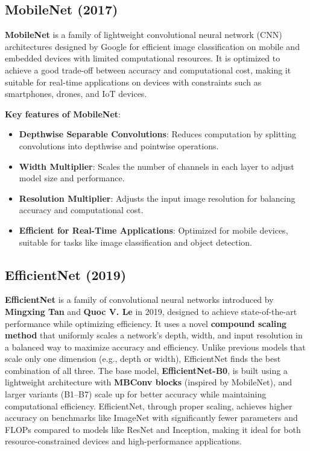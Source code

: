 \subsection{MobileNet (2017)}
\textbf{MobileNet} is a family of lightweight convolutional neural network (CNN) architectures designed by Google for efficient image classification on mobile and embedded devices with limited computational resources. It is optimized to achieve a good trade-off between accuracy and computational cost, making it suitable for real-time applications on devices with constraints such as smartphones, drones, and IoT devices.\cite{howard2017mobilenets}

\textbf{Key features of MobileNet}:
\begin{itemize}
    \item \textbf{Depthwise Separable Convolutions}: Reduces computation by splitting convolutions into depthwise and pointwise operations.
    \item \textbf{Width Multiplier}: Scales the number of channels in each layer to adjust model size and performance.
    \item \textbf{Resolution Multiplier}: Adjusts the input image resolution for balancing accuracy and computational cost.
    \item \textbf{Efficient for Real-Time Applications}: Optimized for mobile devices, suitable for tasks like image classification and object detection.
\end{itemize}

\subsection{EfficientNet (2019)}
\textbf{EfficientNet} is a family of convolutional neural networks introduced by \textbf{Mingxing Tan} and \textbf{Quoc V. Le} in 2019, designed to achieve state-of-the-art performance while optimizing efficiency. It uses a novel \textbf{compound scaling method} that uniformly scales a network's depth, width, and input resolution in a balanced way to maximize accuracy and efficiency. Unlike previous models that scale only one dimension (e.g., depth or width), EfficientNet finds the best combination of all three. The base model, \textbf{EfficientNet-B0}, is built using a lightweight architecture with \textbf{MBConv blocks} (inspired by MobileNet), and larger variants (B1–B7) scale up for better accuracy while maintaining computational efficiency. EfficientNet, through proper scaling, achieves higher accuracy on benchmarks like ImageNet with significantly fewer parameters and FLOPs compared to models like ResNet and Inception, making it ideal for both resource-constrained devices and high-performance applications.\cite{efficientnet}

